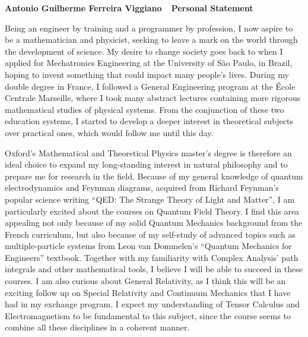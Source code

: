 \documentclass[10pt]{article}
\def\firstname{Antonio Guilherme }
\def\familyname{Ferreira Viggiano}
\def\subj{Personal Statement}
\def\FileTitle{\firstname\familyname~\textemdash~\subj}
\begin{document}
\sffamily %

{\bfseries \FileTitle}


Being an engineer by training and a programmer by profession, I now aspire to be a mathematician and physicist, seeking to leave a mark on the world through the development of science. My desire to change society goes back to when I applied for Mechatronics Engineering at the University of São Paulo, in Brazil, hoping to invent something that could impact many people's lives. During my double degree in France, I followed a General Engineering program at the École Centrale Marseille, where I took many abstract lectures containing more rigorous mathematical studies of physical systems. From the conjunction of these two education systems, I started to develop a deeper interest in theoretical subjects over practical ones, which would follow me until this day.

Oxford's Mathematical and Theoretical Physics master's degree is therefore an ideal choice to expand my long-standing interest in natural philosophy and to prepare me for research in the field. Because of my general knowledge of quantum electrodynamics and Feynman diagrams, acquired from Richard Feynman's popular science writing ``QED: The Strange Theory of Light and Matter'', I am particularly excited about the courses on Quantum Field Theory. I find this area appealing not only because of my solid Quantum Mechanics background from the French curriculum, but also because of my self-study of advanced topics such as multiple-particle systems from Leon van Dommelen's ``Quantum Mechanics for Engineers'' textbook. Together with my familiarity with Complex Analysis' path integrals and other mathematical tools, I believe I will be able to succeed in these courses. I am also curious about General Relativity, as I think this will be an exciting follow up on Special Relativity and Continuum Mechanics that I have had in my exchange program. I expect my understanding of Tensor Calculus and Electromagnetism to be fundamental to this subject, since the course seems to combine all these disciplines in a coherent manner.                
\end{document}
